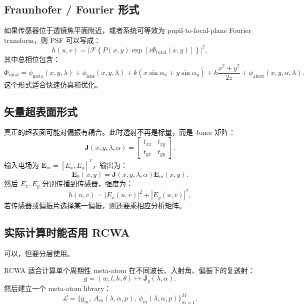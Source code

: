 \documentclass[11pt,a4paper,fontset=none]{ctexart}
\begin{document}
\subsection{Fraunhofer / Fourier 形式}

如果传感器位于透镜焦平面附近，或者系统可等效为 pupil-to-focal-plane Fourier transform，则 PSF 可以写成：
\begin{equation}
  h(u,v)
  =
  \left|
  \mathcal F
  \left\{
  P(x,y)
  \exp[i\Phi_{\mathrm{total}}(x,y)]
  \right\}
  \right|^2,
  \label{eq:fourier_psf}
\end{equation}
其中总相位包含：
\begin{equation}
  \Phi_{\mathrm{total}}
  =
  \phi_{\mathrm{meta}}(x,y,\lambda)
  +
  \phi_{\mathrm{lens}}(x,y,\lambda)
  +
  k(x\sin\alpha_x+y\sin\alpha_y)
  +
  k\frac{x^2+y^2}{2z}
  +
  \phi_{\mathrm{aberr}}(x,y,\alpha,\lambda).
\end{equation}
这个形式适合快速仿真和优化。

\subsection{矢量超表面形式}

真正的超表面可能对偏振有耦合。此时透射不再是标量，而是 Jones 矩阵：
\begin{equation}
  \bm J(x,y,\lambda,\alpha)
  =
  \begin{bmatrix}
  t_{xx} & t_{xy}\\
  t_{yx} & t_{yy}
  \end{bmatrix}.
\end{equation}
输入电场为 $\bm E_{\mathrm{in}}=[E_x,E_y]^T$，输出为：
\begin{equation}
  \bm E_0(x,y)=\bm J(x,y,\lambda,\alpha)\bm E_{\mathrm{in}}(x,y).
\end{equation}
然后 $E_x,E_y$ 分别传播到传感器，强度为：
\begin{equation}
  h(u,v)=|E_x(u,v)|^2+|E_y(u,v)|^2,
\end{equation}
若传感器或偏振片选择某一偏振，则还要乘相应分析矩阵。

\subsection{实际计算时能否用 RCWA}

可以，但要分层使用。

RCWA 适合计算单个周期性 meta-atom 在不同波长、入射角、偏振下的复透射：
\begin{equation}
  g=(w,l,h,\theta)
  \mapsto
  \bm J_g(\lambda,\alpha).
\end{equation}
然后建立一个 meta-atom library：
\begin{equation}
  \mathcal L=\{g_m,\ A_m(\lambda,\alpha,p),\ \phi_m(\lambda,\alpha,p)\}_{m=1}^{M}.
\end{equation}
\end{document}

